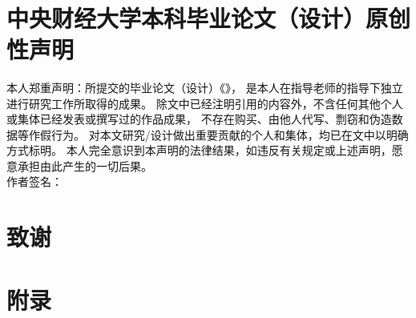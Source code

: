 \documentclass[a4paper,12pt]{report}
\begin{document}
\thispagestyle{plain}
\setcounter{page}{1}
\begin{spacing}{1.8333} %
\tableofcontents %
\end{spacing}
\newpage
\begin{center}
    \textbf{}
    \\[12pt]
\end{center}
\thispagestyle{plain}
\setcounter{page}{1}






\printbibliography
{}

\newpage
\chapter*{中央财经大学本科毕业论文（设计）原创性声明}
\vspace{1mm}
本人郑重声明：所提交的毕业论文（设计）《\MYTITLE》，
是本人在指导老师的指导下独立进行研究工作所取得的成果。
除文中已经注明引用的内容外，不含任何其他个人或集体已经发表或撰写过的作品成果，
不存在购买、由他人代写、剽窃和伪造数据等作假行为。
对本文研究/设计做出重要贡献的个人和集体，均已在文中以明确方式标明。
本人完全意识到本声明的法律结果，如违反有关规定或上述声明，愿意承担由此产生的一切后果。
\\[50pt]
作者签名：\\

\newpage
\chapter*{致谢}

\newpage
\chapter*{附录}
\end{document}
